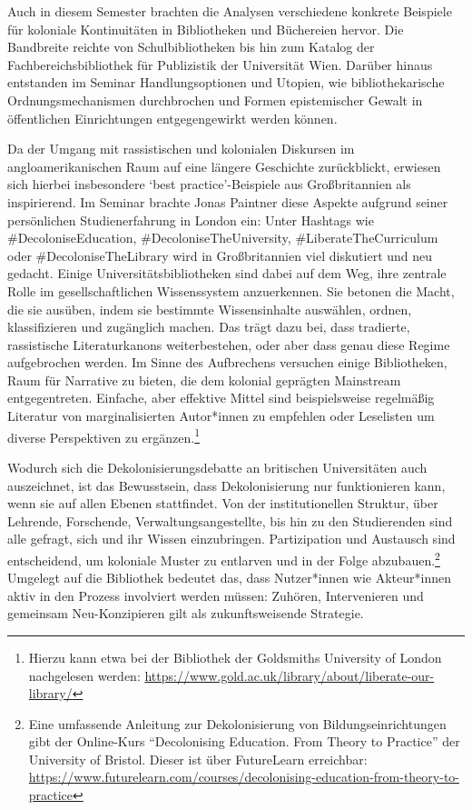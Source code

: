 \documentclass[a4paper,
fontsize=11pt,
oneside,
numbers=noperiodatend,
parskip=half-,
bibliography=totoc,
final
]{scrartcl}
\begin{document}
Auch in diesem Semester brachten die Analysen verschiedene konkrete
Beispiele für koloniale Kontinuitäten in Bibliotheken und Büchereien
hervor. Die Bandbreite reichte von Schulbibliotheken bis hin zum Katalog
der Fachbereichsbibliothek für Publizistik der Universität Wien. Darüber
hinaus entstanden im Seminar Handlungsoptionen und Utopien, wie
bibliothekarische Ordnungsmechanismen durchbrochen und Formen
epistemischer Gewalt in öffentlichen Einrichtungen entgegengewirkt
werden können.

Da der Umgang mit rassistischen und kolonialen Diskursen im
angloamerikanischen Raum auf eine längere Geschichte zurückblickt,
erwiesen sich hierbei insbesondere \enquote*{best practice}-Beispiele
aus Großbritannien als inspirierend. Im Seminar brachte Jonas Paintner
diese Aspekte aufgrund seiner persönlichen Studienerfahrung in London
ein: Unter Hashtags wie \#DecoloniseEducation,
\#DecoloniseTheUniversity, \#LiberateTheCurriculum oder
\#DecoloniseTheLibrary wird in Großbritannien viel diskutiert und neu
gedacht. Einige Universitätsbibliotheken sind dabei auf dem Weg, ihre
zentrale Rolle im gesellschaftlichen Wissenssystem anzuerkennen. Sie
betonen die Macht, die sie ausüben, indem sie bestimmte Wissensinhalte
auswählen, ordnen, klassifizieren und zugänglich machen. Das trägt dazu
bei, dass tradierte, rassistische Literaturkanons weiterbestehen, oder
aber dass genau diese Regime aufgebrochen werden. Im Sinne des
Aufbrechens versuchen einige Bibliotheken, Raum für Narrative zu bieten,
die dem kolonial geprägten Mainstream entgegentreten. Einfache, aber
effektive Mittel sind beispielsweise regelmäßig Literatur von
marginalisierten Autor*innen zu empfehlen oder Leselisten um diverse
Perspektiven zu ergänzen.\footnote{Hierzu kann etwa bei der Bibliothek
  der Goldsmiths University of London nachgelesen werden:
  \url{https://www.gold.ac.uk/library/about/liberate-our-library/}}

Wodurch sich die Dekolonisierungsdebatte an britischen Universitäten
auch auszeichnet, ist das Bewusstsein, dass Dekolonisierung nur
funktionieren kann, wenn sie auf allen Ebenen stattfindet. Von der
institutionellen Struktur, über Lehrende, Forschende,
Verwaltungsangestellte, bis hin zu den Studierenden sind alle gefragt,
sich und ihr Wissen einzubringen. Partizipation und Austausch sind
entscheidend, um koloniale Muster zu entlarven und in der Folge
abzubauen.\footnote{Eine umfassende Anleitung zur Dekolonisierung von
  Bildungseinrichtungen gibt der Online-Kurs \enquote{Decolonising
  Education. From Theory to Practice} der University of Bristol. Dieser
  ist über FutureLearn erreichbar:
  \url{https://www.futurelearn.com/courses/decolonising-education-from-theory-to-practice}}
Umgelegt auf die Bibliothek bedeutet das, dass Nutzer*innen wie
Akteur*innen aktiv in den Prozess involviert werden müssen: Zuhören,
Intervenieren und gemeinsam Neu-Konzipieren gilt als zukunftsweisende
Strategie.
\end{document}
